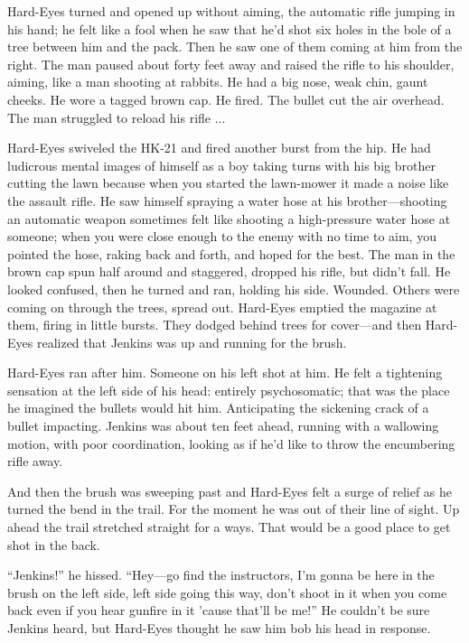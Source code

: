 Hard-Eyes turned and opened up without aiming, the automatic rifle jumping in his hand; he felt like a fool when he saw that he'd shot six holes in the bole of a tree between him and the pack. Then he saw one of them coming at him from the right. The man paused about forty feet away and raised the rifle to his shoulder, aiming, like a man shooting at rabbits. He had a big nose, weak chin, gaunt cheeks. He wore a tagged brown cap. He fired. The bullet cut the air overhead. The man struggled to reload his rifle ...

Hard-Eyes swiveled the HK-21 and fired another burst from the hip. He had ludicrous mental images of himself as a boy taking turns with his big brother cutting the lawn because when you started the lawn-mower it made a noise like the assault rifle. He saw himself spraying a water hose at his brother---shooting an automatic weapon sometimes felt like shooting a high-pressure water hose at someone; when you were close enough to the enemy with no time to aim, you pointed the hose, raking back and forth, and hoped for the best. The man in the brown cap spun half around and staggered, dropped his rifle, but didn't fall. He looked confused, then he turned and ran, holding his side. Wounded. Others were coming on through the trees, spread out. Hard-Eyes emptied the magazine at them, firing in little bursts. They dodged behind trees for cover---and then Hard-Eyes realized that Jenkins was up and running for the brush.

Hard-Eyes ran after him. Someone on his left shot at him. He felt a tightening sensation at the left side of his head: entirely psychosomatic; that was the place he imagined the bullets would hit him. Anticipating the sickening crack of a bullet impacting. Jenkins was about ten feet ahead, running with a wallowing motion, with poor coordination, looking as if he'd like to throw the encumbering rifle away.

And then the brush was sweeping past and Hard-Eyes felt a surge of relief as he turned the bend in the trail. For the moment he was out of their line of sight. Up ahead the trail stretched straight for a ways. That would be a good place to get shot in the back.

``Jenkins!'' he hissed. ``Hey---go find the instructors, I'm gonna be here in the brush on the left side, left side going this way, don't shoot in it when you come back even if you hear gunfire in it 'cause that'll be me!'' He couldn't be sure Jenkins heard, but Hard-Eyes thought he saw him bob his head in response.

